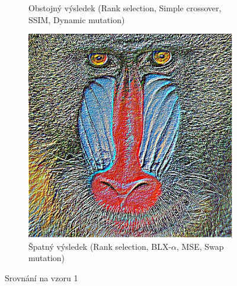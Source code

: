 \documentclass[a4paper,11pt]{scrartcl}
\begin{document}
\begin{figure}[!h]
\begin{subfigure}[b]{0.32\textwidth}
        \caption{Obstojný výsledek (Rank selection, Simple crossover, SSIM, Dynamic mutation)}
        \label{fig:ex12}
    \end{subfigure}
    \begin{subfigure}[b]{0.32\textwidth}
        \includegraphics[width=\textwidth]{img/ranksel-blx_a-mse-swap_example1.jpg}
        \caption{Špatný výsledek (Rank selection, BLX-$\alpha$, MSE, Swap mutation)}
        \label{fig:ex13}
    \end{subfigure}
    \caption{Srovnání na vzoru 1}
    \label{porovnani_ex1}
\end{figure}
\end{document}
